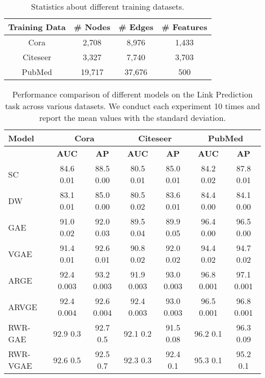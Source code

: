 \documentclass{article}
\begin{document}
\begin{table}[!h]
\centering{}
\begin{tabular}{c c c c}
  \toprule
 Training Data & \# Nodes & \# Edges & \# Features\\
  \midrule
	Cora & 2,708 & 8,976 & 1,433\\ 
	Citeseer & 3,327 & 7,740 & 3,703\\
	PubMed & 19,717 & 37,676 & 500\\
  \bottomrule
\end{tabular}
\caption{Statistics about different training datasets. \label{stats}}
\end{table}

\begin{table*}[t]
\begin{center}
\begin{tabular}{lcccccc}
\toprule
{\bf Model}&\multicolumn{2}{c}{\bf Cora }&\multicolumn{2}{c}{\bf Citeseer} &\multicolumn{2}{c}{\bf PubMed}\\
\midrule
& \bf AUC & \bf AP & \bf AUC & \bf AP & \bf AUC & \bf AP \\
\midrule
SC & 84.6    0.01 & 88.5    0.00 & 80.5    0.01 & 85.0    0.01 & 84.2    0.02 & 87.8    0.01\\
DW & 83.1   0.01 & 85.0    0.00 & 80.5    0.02 & 83.6    0.01 & 84.4    0.00 & 84.1    0.00\\
GAE & 91.0   0.02 & 92.0    0.03 & 89.5    0.04 & 89.9    0.05 & 96.4    0.00 & 96.5    0.00\\
VGAE & 91.4   0.01 & 92.6    0.01 & 90.8    0.02 & 92.0    0.02 & 94.4    0.02 & 94.7    0.02\\
ARGE & 92.4    0.003 & 93.2    0.003 & 91.9    0.003 & 93.0   0.003 & 96.8    0.001 & 97.1    0.001\\
ARVGE & 92.4    0.004 & 92.6    0.004 & 92.4    0.003 & 93.0    0.003 & 96.5   0.001 & 96.8   0.001\\
\midrule
RWR-GAE & 92.9  0.3 & 92.7  0.5 & 92.1  0.2 & 91.5  0.08 & 96.2  0.1 & 96.3  0.09\\
RWR-VGAE & 92.6  0.5 & 92.5  0.7 & 92.3  0.3 & 92.4  0.1& 95.3  0.1 & 95.2  0.1\\
\bottomrule
\end{tabular}
\end{center}
\caption{Performance comparison of different models on the Link Prediction task across various datasets. We conduct each experiment 10 times and report the mean values with the standard deviation.}
\label{results:lp}
\end{table*}
\end{document}
